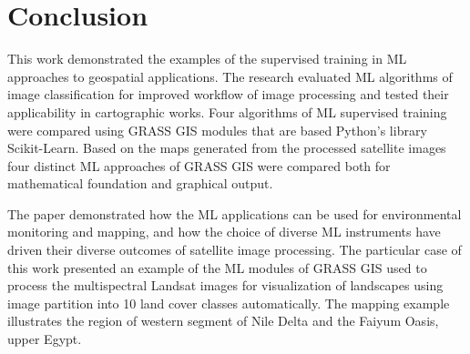 \documentclass[final,5p,times,twocolumn]{elsarticle}
\begin{document}
\section{Conclusion}

This work demonstrated the examples of the supervised training in ML approaches to geospatial applications. The research evaluated ML algorithms of image classification for improved workflow of image processing and tested their applicability in cartographic works. Four algorithms of ML supervised training were compared using GRASS GIS modules that are based Python's library Scikit-Learn. Based on the maps generated from the processed satellite images four distinct ML approaches of GRASS GIS were compared both for mathematical foundation and graphical output. 

The paper demonstrated how the ML applications can be used for environmental monitoring and mapping, and how the choice of diverse ML instruments have driven their diverse outcomes of satellite image processing. The particular case of this work presented an example of the ML modules of GRASS GIS used to process the multispectral Landsat images for visualization of landscapes using image partition into 10 land cover classes automatically. The mapping example illustrates the region of western segment of Nile Delta and the Faiyum Oasis, upper Egypt. 

\appendix

 


\end{document}
